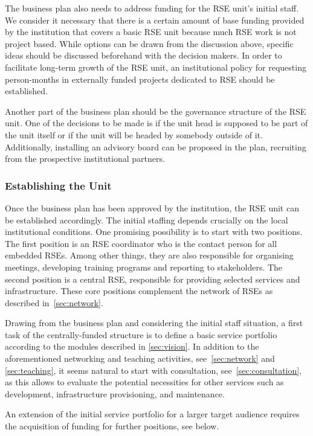 \documentclass[10pt,letterpaper]{article}
\begin{document}
The business plan also needs to address funding for the RSE unit's initial staff.
We consider it necessary that there is a certain amount of base funding provided by the institution that covers a basic RSE unit because much RSE work is not project based.
While options can be drawn from the discussion above, specific ideas should be discussed beforehand with the decision makers.
In order to facilitate long-term growth of the RSE unit, an institutional policy for requesting person-months in externally funded projects dedicated to RSE should be established.

Another part of the business plan should be the governance structure of the RSE unit.
One of the decisions to be made is if the unit head is supposed to be part of the unit itself or if the unit will be headed by somebody outside of it.
Additionally, installing an advisory board can be proposed in the plan, recruiting from the prospective institutional partners.

\subsubsection*{Establishing the Unit}
Once the business plan has been approved by the institution, the RSE unit can be established accordingly.
The initial staffing depends crucially on the local institutional conditions.
One promising possibility is to start with two positions.
The first position is an RSE coordinator who is the contact person for all embedded RSEs.
Among other things, they are also responsible for organising meetings, developing training programs and reporting to stakeholders.
The second position is a central RSE, responsible for providing selected services and infrastructure.
These core positions complement the network of RSEs as described in~\autoref{sec:network}.

Drawing from the business plan and considering the initial staff situation, a first task of the centrally-funded structure is to define a basic service portfolio according to the modules described in \autoref{sec:vision}.
In addition to the aforementioned networking and teaching activities, see~\autoref{sec:network} and \autoref{sec:teaching}, it seems natural to start with consultation, see~\autoref{sec:consultation},
  as this allows to evaluate the potential necessities for other services such as development, infrastructure provisioning, and maintenance.

An extension of the initial service portfolio for a larger target audience requires the acquisition of funding for further positions, see below.
\end{document}
